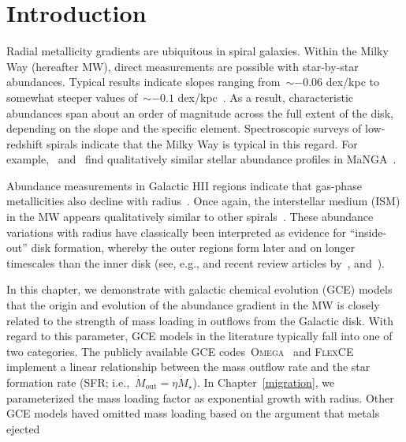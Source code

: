 \section{Introduction}
\label{outflows:sec:intro}
Radial metallicity gradients are ubiquitous in spiral galaxies.
Within the Milky Way (hereafter MW), direct measurements are possible with
star-by-star abundances.
Typical results indicate slopes ranging from~$\sim$$-0.06$ dex/kpc to somewhat
steeper values of~$\sim$$-0.1$ dex/kpc~\citep[e.g.,][]{Nordstroem2004,
Cheng2012, Frinchaboy2013, Hayden2014, Weinberg2019, Myers2022}.
As a result, characteristic abundances span about an order of magnitude across
the full extent of the disk, depending on the slope and the specific element.
Spectroscopic surveys of low-redshift spirals indicate that the Milky Way is
typical in this regard.
For example,~\citet{Goddard2017} and~\citet{Parikh2021} find qualitatively
similar stellar abundance profiles in MaNGA~\citep{Bundy2015}.
\par
Abundance measurements in Galactic HII regions indicate that gas-phase
metallicities also decline with radius~\citep[e.g.,][]{Simpson1995,
Afflerbach1997, Esteban2022, MendezDelgado2022, MendezDelgado2023}.
Once again, the interstellar medium (ISM) in the MW appears qualitatively
similar to other spirals~\citep[e.g.,][]{Belfiore2017, Berg2020,
Franchetto2021, Lutz2021, Boardman2022}.
These abundance variations with radius have classically been interpreted as
evidence for ``inside-out'' disk formation, whereby the outer regions form
later and on longer timescales than the inner disk (see, e.g.,
\citealt{Kauffmann1996} and recent review articles by~\citealt{Kewley2019,
Maiolino2019}, and~\citealt{Sanchez2020}).
\par
In this chapter, we demonstrate with galactic chemical evolution (GCE) models
that the origin and evolution of the abundance gradient in the MW is closely
related to the strength of mass loading in outflows from the Galactic disk.
With regard to this parameter, GCE models in the literature typically fall into
one of two categories.
The publicly available GCE codes~\textsc{Omega}~\citep{Cote2017} and
\textsc{FlexCE}~\citep{Andrews2017} implement a linear relationship between the
mass outflow rate and the star formation rate (SFR;
i.e.,~$\dot{M}_\text{out} = \eta \dot{M}_\star$).
In Chapter~\ref{migration}, we parameterized the mass loading factor as
exponential growth with radius. 
Other GCE models haved omitted mass loading
\citep[i.e.,~$\eta = 0$; e.g.,][]{Minchev2013, Minchev2014, Spitoni2019,
Spitoni2020, Spitoni2021} based on the argument that metals ejected
